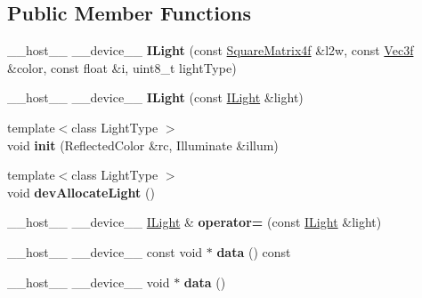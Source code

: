 \subsection*{Public Member Functions}
\begin{DoxyCompactItemize}
\item 
\+\_\+\+\_\+host\+\_\+\+\_\+ \+\_\+\+\_\+device\+\_\+\+\_\+ {\bfseries I\+Light} (const \hyperlink{class_square_matrix4}{Square\+Matrix4f} \&l2w, const \hyperlink{class_vec3}{Vec3f} \&color, const float \&i, uint8\+\_\+t light\+Type)\hypertarget{class_i_light_aa788ba40470cbbd251cf06b9a80c7a77}{}\label{class_i_light_aa788ba40470cbbd251cf06b9a80c7a77}

\item 
\+\_\+\+\_\+host\+\_\+\+\_\+ \+\_\+\+\_\+device\+\_\+\+\_\+ {\bfseries I\+Light} (const \hyperlink{class_i_light}{I\+Light} \&light)\hypertarget{class_i_light_ae44c2228daf4c95f4df2fea3c50c8abf}{}\label{class_i_light_ae44c2228daf4c95f4df2fea3c50c8abf}

\item 
{\footnotesize template$<$class Light\+Type $>$ }\\void {\bfseries init} (Reflected\+Color \&rc, Illuminate \&illum)\hypertarget{class_i_light_a3c93b73052074a1dc80d6a18f027e8e1}{}\label{class_i_light_a3c93b73052074a1dc80d6a18f027e8e1}

\item 
{\footnotesize template$<$class Light\+Type $>$ }\\void {\bfseries dev\+Allocate\+Light} ()\hypertarget{class_i_light_a1c67d8cf9d7492c1ff61c156abaa0323}{}\label{class_i_light_a1c67d8cf9d7492c1ff61c156abaa0323}

\item 
\+\_\+\+\_\+host\+\_\+\+\_\+ \+\_\+\+\_\+device\+\_\+\+\_\+ \hyperlink{class_i_light}{I\+Light} \& {\bfseries operator=} (const \hyperlink{class_i_light}{I\+Light} \&light)\hypertarget{class_i_light_a9852bdb910c17654c08b76a9df20fd25}{}\label{class_i_light_a9852bdb910c17654c08b76a9df20fd25}

\item 
\+\_\+\+\_\+host\+\_\+\+\_\+ \+\_\+\+\_\+device\+\_\+\+\_\+ const void $\ast$ {\bfseries data} () const\hypertarget{class_i_light_aab75634731a67d8d1802044c34d1facd}{}\label{class_i_light_aab75634731a67d8d1802044c34d1facd}

\item 
\+\_\+\+\_\+host\+\_\+\+\_\+ \+\_\+\+\_\+device\+\_\+\+\_\+ void $\ast$ {\bfseries data} ()\hypertarget{class_i_light_ac22951f44f0e03cd4552cee51daad9f8}{}\label{class_i_light_ac22951f44f0e03cd4552cee51daad9f8}


\end{DoxyCompactItemize}
